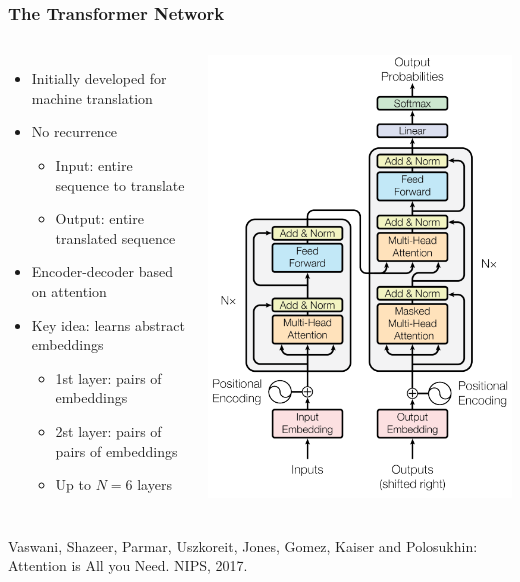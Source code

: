\documentclass[10pt]{beamer}
\begin{document}
\begin{frame}
  \frametitle{The Transformer Network}
  \begin{columns}
\begin{itemize}
\setlength\itemsep{.8em}
\item Initially developed for machine translation
\item No recurrence
\begin{itemize}
\item Input: entire sequence to translate
\item Output: entire translated sequence
\end{itemize}
\item Encoder-decoder based on attention 
\item Key idea: learns abstract embeddings
\begin{itemize}
\item 1st layer: pairs of embeddings
\item 2st layer: pairs of pairs of embeddings
\item Up to $N=6$ layers
\end{itemize}
\end{itemize}
\begin{center}
	\includegraphics[width=.7\columnwidth]{images/transf}
\end{center}
    \end{columns}
\scriptsize{Vaswani, Shazeer, Parmar, Uszkoreit, Jones, Gomez, Kaiser and Polosukhin: Attention is All you Need. NIPS, 2017.}
\end{frame}
\end{document}
